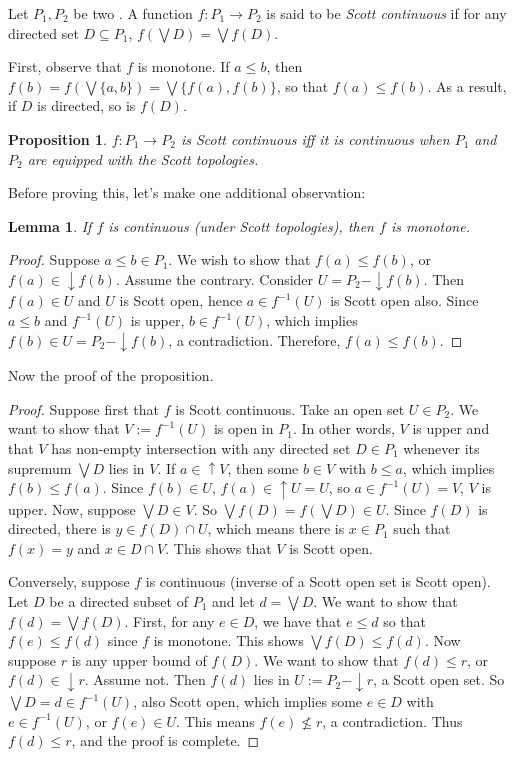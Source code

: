 \documentclass[12pt]{article}
\newtheorem{prop}{Proposition}
\newtheorem{lem}{Lemma}
\newcommand{\up}{\uparrow\!\!}
\newcommand{\down}{\downarrow\!\!}
\begin{document}
Let $P_1,P_2$ be two .  A function $f:P_1\to P_2$ is said to be \emph{Scott continuous} if for any directed set $D\subseteq P_1$, $f(\bigvee D)=\bigvee f(D)$.

First, observe that $f$ is monotone.  If $a\le b$, then $f(b)=f(\bigvee \lbrace a,b\rbrace)=\bigvee \lbrace f(a),f(b)\rbrace$, so that $f(a)\le f(b)$.  As a result, if $D$ is directed, so is $f(D)$.

\begin{prop}  $f:P_1\to P_2$ is Scott continuous iff it is continuous when $P_1$ and $P_2$ are equipped with the Scott topologies. \end{prop}

Before proving this, let's make one additional observation: 
\begin{lem} If $f$ is continuous (under Scott topologies), then $f$ is monotone.  \end{lem}
\begin{proof}
Suppose $a\le b\in P_1$.  We wish to show that $f(a)\le f(b)$, or $f(a)\in \down f(b)$.  Assume the contrary.  Consider $U=P_2-\down f(b)$.  Then $f(a)\in U$ and $U$ is Scott open, hence $a\in f^{-1}(U)$ is Scott open also.  Since $a\le b$ and $f^{-1}(U)$ is upper, $b\in f^{-1}(U)$, which implies $f(b)\in U=P_2-\down f(b)$, a contradiction.  Therefore, $f(a)\le f(b)$.
\end{proof}

Now the proof of the proposition.

\begin{proof}
Suppose first that $f$ is Scott continuous.  Take an open set $U\in P_2$.  We want to show that $V:=f^{-1}(U)$ is open in $P_1$.  In other words, $V$ is upper and that $V$ has non-empty intersection with any directed set $D\in P_1$ whenever its supremum $\bigvee D$ lies in $V$.  If $a\in \up V$, then some $b\in V$ with $b\le a$, which implies $f(b)\le f(a)$.  Since $f(b)\in U$, $f(a)\in \up U=U$, so $a\in f^{-1}(U)=V$, $V$ is upper.  Now, suppose $\bigvee D \in V$.  So $\bigvee f(D)=f(\bigvee D)\in U$.  Since $f(D)$ is directed, there is $y\in f(D)\cap U$, which means there is $x\in P_1$ such that $f(x)=y$ and $x \in D\cap V$.  This shows that $V$ is Scott open.

Conversely, suppose $f$ is continuous (inverse of a Scott open set is Scott open).  Let $D$ be a directed subset of $P_1$ and let $d=\bigvee D$.  We want to show that $f(d)=\bigvee f(D)$.  First, for any $e\in D$, we have that $e\le d$ so that $f(e)\le f(d)$ since $f$ is monotone.  This shows $\bigvee f(D)\le f(d)$.  Now suppose $r$ is any upper bound of $f(D)$.  We want to show that $f(d)\le r$, or $f(d)\in \down r$.  Assume not.  Then $f(d)$ lies in $U:=P_2-\down r$, a Scott open set.  So $\bigvee D=d\in f^{-1}(U)$, also Scott open, which implies some $e\in D$ with $e\in f^{-1}(U)$, or $f(e)\in U$.  This means $f(e) \not\le r$, a contradiction.  Thus $f(d)\le r$, and the proof is complete.
\end{proof}
\end{document}
